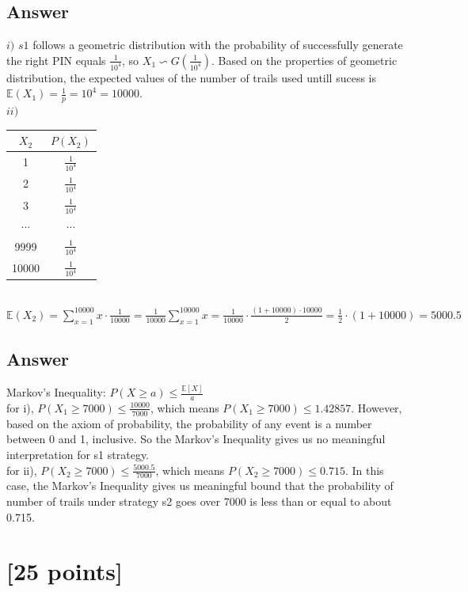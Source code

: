 \subsection{Answer}
 $i)$ $ s1 $ follows a geometric distribution with the probability of successfully generate the right PIN 
 equals $\frac{1}{10^4}$, so $X_1 \backsim G(\frac{1}{10^4})$. Based on the properties of geometric distribution, the expected values of the 
 number of trails used untill sucess is $\mathbb{E} (X_1) = \frac{1}{p} = 10^4 = 10000$. \\
 $ii)$  
 \begin{tabular}{c|c}
	$X_2$  & $P(X_2)$ \\
	\hline
	1 & $\frac{1}{10^4}$ \\
	2 & $\frac{1}{10^4}$ \\
	3 & $\frac{1}{10^4}$\\
	$\cdots$ & $\cdots$ \\
	9999 & $\frac{1}{10^4}$\\
	10000 & $\frac{1}{10^4}$ \\
	\end{tabular}
	\\
$\mathbb{E} (X_2) = \sum_{x=1}^{10000} x \cdot \frac{1}{10000} 
= \frac{1}{10000} \sum_{x=1}^{10000} x 
= \frac{1}{10000} \cdot \frac{(1+10000) \cdot 10000}{2} 
= \frac{1}{2} \cdot (1 + 10000) = 5000.5$

\subsection{Answer}
Markov's Inequality: $P(X \geq a) \leq \frac{\mathbb{E}[X]}{a}$ \\ 
for i), $P(X_1 \geq 7000) \leq \frac{10000}{7000}$, which means $P(X_1 \geq 7000) \leq 1.42857$.
However, based on the axiom of probability, the probability of any event is a number between 0 and 1, inclusive.
So the Markov's Inequality gives us no meaningful interpretation for s1 strategy. \\
for ii), $P(X_2 \geq 7000) \leq \frac{5000.5}{7000}$, which means $P(X_2 \geq 7000) \leq 0.715$.
In this case, the Markov's Inequality gives us meaningful bound that the probability of number of trails under strategy s2 goes
over 7000 is less than or equal to about 0.715.




\newpage 

\section{ [25 points]} 
 

